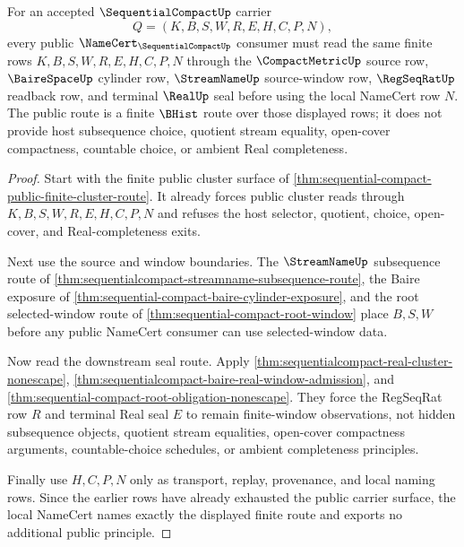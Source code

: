 \begin{theorem}
\label{thm:sequentialcompact-public-namecert-route}
For an accepted $\SequentialCompactUp$ carrier
$$
Q=(K,B,S,W,R,E,H,C,P,N),
$$
every public $\NameCert_{\SequentialCompactUp}$ consumer must read the same finite rows $K,B,S,W,R,E,H,C,P,N$ through the $\CompactMetricUp$ source row, $\BaireSpaceUp$ cylinder row, $\StreamNameUp$ source-window row, $\RegSeqRatUp$ readback row, and terminal $\RealUp$ seal before using the local NameCert row $N$. The public route is a finite $\BHist$ route over those displayed rows; it does not provide host subsequence choice, quotient stream equality, open-cover compactness, countable choice, or ambient Real completeness.
\end{theorem}
\begin{proof}
Start with the finite public cluster surface of \autoref{thm:sequential-compact-public-finite-cluster-route}. It already forces public cluster reads through $K,B,S,W,R,E,H,C,P,N$ and refuses the host selector, quotient, choice, open-cover, and Real-completeness exits.

Next use the source and window boundaries. The $\StreamNameUp$ subsequence route of \autoref{thm:sequentialcompact-streamname-subsequence-route}, the Baire exposure of \autoref{thm:sequential-compact-baire-cylinder-exposure}, and the root selected-window route of \autoref{thm:sequential-compact-root-window} place $B,S,W$ before any public NameCert consumer can use selected-window data.

Now read the downstream seal route. Apply \autoref{thm:sequentialcompact-real-cluster-nonescape}, \autoref{thm:sequentialcompact-baire-real-window-admission}, and \autoref{thm:sequential-compact-root-obligation-nonescape}. They force the RegSeqRat row $R$ and terminal Real seal $E$ to remain finite-window observations, not hidden subsequence objects, quotient stream equalities, open-cover compactness arguments, countable-choice schedules, or ambient completeness principles.

Finally use $H,C,P,N$ only as transport, replay, provenance, and local naming rows. Since the earlier rows have already exhausted the public carrier surface, the local NameCert names exactly the displayed finite route and exports no additional public principle.
\end{proof}

